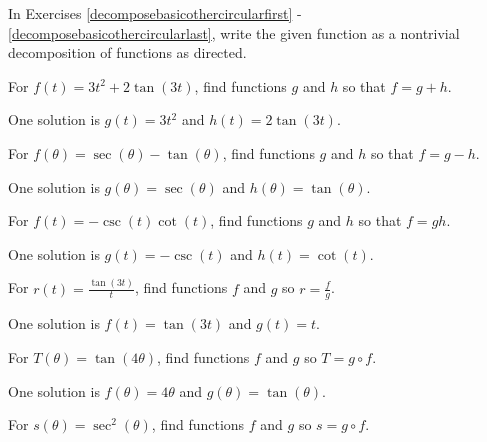 \documentclass{ximera}
\begin{document}
\begin{question}
In Exercises \ref{decomposebasicothercircularfirst} - \ref{decomposebasicothercircularlast}, write the given function as a nontrivial decomposition of functions as directed.

\begin{problem} \label{decomposebasicothercircularfirst}
For $f(t) = 3t^2 + 2 \tan(3t)$, find functions $g$ and $h$ so that $f=g+h$. 

\begin{solution}
One solution is $g(t) = 3t^2$ and $h(t) = 2\tan(3t)$.
\end{solution}
\end{problem}

\begin{problem}
For $f(\theta) = \sec(\theta) - \tan(\theta)$, find functions $g$ and $h$ so that $f=g-h$.

\begin{solution}
One solution is $g(\theta) = \sec(\theta)$ and $h(\theta) = \tan(\theta)$.
\end{solution}
\end{problem}

\begin{problem}
For $f(t) = -\csc(t) \cot(t)$, find functions $g$ and $h$ so that $f=gh$.

\begin{solution}
 One solution is $g(t) = -\csc(t)$ and $h(t) = \cot(t)$.
\end{solution}
\end{problem}

\begin{problem}
For $r(t) = \frac{\tan(3t)}{t}$, find functions $f$ and $g$ so $r = \frac{f}{g}$.

\begin{solution}
One solution is $f(t) = \tan(3t)$ and $g(t) = t$.
\end{solution}
\end{problem}

\begin{problem}
For $T(\theta) =\tan(4 \theta)$, find functions $f$ and $g$ so $T = g \circ f$.

\begin{solution}
One solution is $f(\theta) = 4 \theta$ and $g(\theta) = \tan(\theta)$.
\end{solution}
\end{problem}

\begin{problem}
For $s(\theta) = \sec^{2}(\theta)$, find functions $f$ and $g$ so $s = g \circ f$.


\end{problem}
\end{question}
\end{document}
